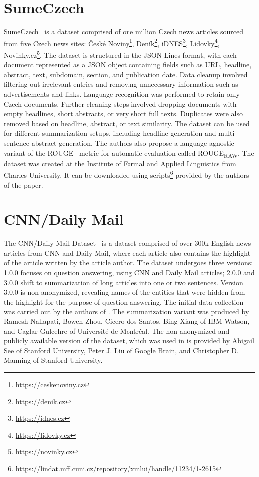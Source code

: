 \documentclass[english, ba, kiv, he, iso690numb, pdf, viewonly]{fasthesis}
\begin{document}
\section{SumeCzech} \label{sumeczech-section}
SumeCzech~\cite{straka-etal-2018-sumeczech} is a dataset comprised of one million Czech news articles sourced from five Czech news sites: České Noviny\footnote{\url{https://ceskenoviny.cz}}, Deník\footnote{\url{https://denik.cz}}, iDNES\footnote{\url{https://idnes.cz}}, Lidovky\footnote{\url{https://lidovky.cz}}, Novinky.cz\footnote{\url{https://novinky.cz}}. The dataset is structured in the JSON Lines format, with each document represented as a JSON object containing fields such as URL, headline, abstract, text, subdomain, section, and publication date. Data cleanup involved filtering out irrelevant entries and removing unnecessary information such as advertisements and links. Language recognition was performed to retain only Czech documents. Further cleaning steps involved dropping documents with empty headlines, short abstracts, or very short full texts. Duplicates were also removed based on headline, abstract, or text similarity. The dataset can be used for different summarization setups, including headline generation and multi-sentence abstract generation. The authors also propose a language-agnostic variant of the ROUGE~\cite{lin-2004-rouge} metric for automatic evaluation called ROUGE\textsubscript{RAW}. The dataset was created at the Institute of Formal and Applied Linguistics from Charles University. It can be downloaded using scripts\footnote{\url{https://lindat.mff.cuni.cz/repository/xmlui/handle/11234/1-2615}} provided by the authors of the paper.

\section{CNN/Daily Mail}\label{cnn/dm}
The CNN/Daily Mail Dataset~\cite{HermannKGEKSB15} is a dataset comprised of over 300k English news articles from CNN and Daily Mail, where each article also contains the highlight of the article written by the article author. The dataset undergoes three versions: 1.0.0 focuses on question answering, using CNN and Daily Mail articles; 2.0.0 and 3.0.0 shift to summarization of long articles into one or two sentences. Version 3.0.0 is non-anonymized, revealing names of the entities that were hidden from the highlight for the purpose of question answering. The initial data collection was carried out by the authors of \cite{HermannKGEKSB15}. The summarization variant was produced by Ramesh Nallapati, Bowen Zhou, Cicero dos Santos, Bing Xiang of IBM Watson, and Caglar Gulcehre of Université de Montréal. The non-anonymized and publicly available version of the dataset, which was used in \cite{see-etal-2017-get} is provided by Abigail See of Stanford University, Peter J. Liu of Google Brain, and Christopher D. Manning of Stanford University. 
\end{document}

